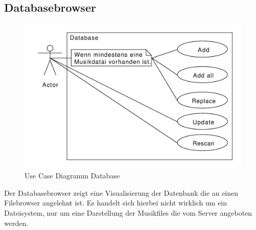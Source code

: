 \subsection{Databasebrowser}
\begin{figure}[htb!]
    \centering
    \includegraphics[width=\textwidth]{./gfx/usec/database}
    \caption{Use Case Diagramm Database}
    \label{uc_database}
\end{figure}
Der Databasebrowser zeigt eine Visualisierung der Datenbank die an einen Filebrowser angelehnt ist.
Es handelt sich hierbei nicht wirklich um ein Dateisystem, nur um eine Darstellung der Musikfiles die vom Server angeboten werden.
